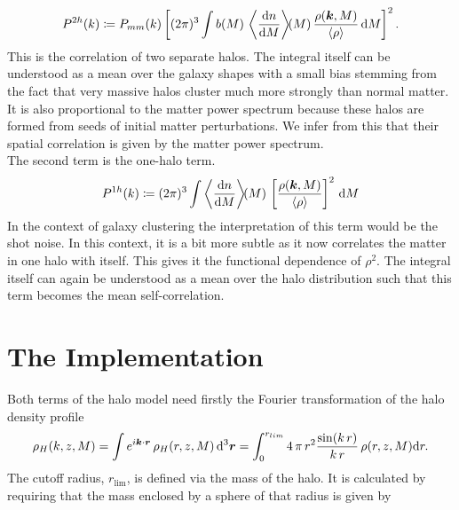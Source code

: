 \documentclass[../main.tex]{subfiles}
\begin{document}
\begin{equation}
P^{2h}(k) \coloneqq P_{mm}(k) \left[(2\pi)^3\int b(M)\,\left\langle\frac{\mathrm{d} n}{\mathrm{d} M}\right\rangle\!\!(M)\,\frac{\rho(\boldsymbol{k},M)}{\langle \rho \rangle} \, \mathrm{d} M\right]^2.
\end{equation}
This is the correlation of two separate halos. The integral itself can be understood as a mean over the galaxy shapes with a small bias stemming from the fact that very massive halos cluster much more strongly than normal matter. It is also proportional to the matter power spectrum because these halos are formed from seeds of initial matter perturbations. We infer from this that their spatial correlation is given by the matter power spectrum.\\
The second term is the one-halo term.
\begin{equation}
    P^{1h}(k) \coloneqq (2\pi)^3 \int \left\langle\frac{\mathrm{d} n}{\mathrm{d} M}\right\rangle\!\!(M)\,\left[\frac{\rho(\boldsymbol{k},M)}{\langle \rho \rangle}\right]^2 \,\mathrm{d} M
\end{equation}
In the context of galaxy clustering the interpretation of this term would be the shot noise. In this context, it is a bit more subtle as it now correlates the matter in one halo with itself. This gives it the functional dependence of $\rho^2$. The integral itself can again be understood as a mean over the halo distribution such that this term becomes the mean self-correlation. 

\section{The \hmcode Implementation}
Both terms of the halo model need firstly the Fourier transformation of the halo density profile
\begin{equation}
    \rho_H(k,z,M) = \int e^{i\boldsymbol{k}\cdot \boldsymbol{r}}\,\rho_H(r,z,M)\,\mathrm{d}^3 \boldsymbol{r} = \int_0^{r_{lim}} 4\,\pi\,r^2 \frac{\sin(k\,r)}{k\,r}\,\rho(r,z,M) \mathrm{d} r.
\end{equation}
The cutoff radius, $r_\mathrm{lim}$, is defined via the mass of the halo. It is calculated by requiring that the mass enclosed by a sphere of that radius is given by 
\end{document}

